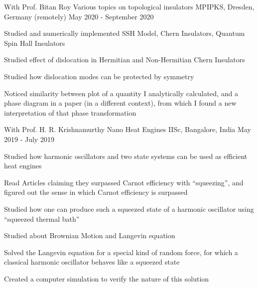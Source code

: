 

\begin{cventries}
	
\cventry
{With Prof. Bitan Roy} %
{Various topics on topological insulators} %
{MPIPKS, Dresden, Germany (remotely)} %
{May 2020 - September 2020} %
{
	\begin{cvitems} %
		\item {Studied and numerically implemented SSH Model, Chern Insulators, Quantum Spin Hall Insulators}
		\item {Studied effect of dislocation in Hermitian and Non-Hermitian Chern Insulators}
		\item {Studied how dislocation modes can be protected by symmetry}
		\item {Noticed similarity between plot of a quantity I analytically calculated, and a phase diagram in a paper (in a different context), from which I found a new interpretation of that phase transformation}
	\end{cvitems}
}

  \cventry
    {With Prof. H. R. Krishnamurthy} %
    {Nano Heat Engines} %
    {IISc, Bangalore, India} %
    {May 2019 - July 2019} %
    {
      \begin{cvitems} %
        \item {Studied how harmonic oscillators and two state systems can be used as efficient heat engines}
        \item {Read Articles claiming they surpassed Carnot efficiency with ``squeezing'', and figured out the sense in which Carnot efficiency is surpassed}
        \item {Studied how one can produce such a squeezed state of a harmonic oscillator using ``squeezed thermal bath''}
        \item {Studied about Brownian Motion and Langevin equation}
        \item {Solved the Langevin equation for a special kind of random force, for which a classical harmonic oscillator behaves like a squeezed state}
        \item {Created a computer simulation to verify the nature of this solution}
      \end{cvitems}
    }


\end{cventries}
